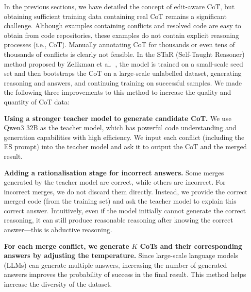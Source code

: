 \documentclass[sigconf,review,anonymous]{acmart}
\newcommand{\stma}[1]{\todo[inline]{\textcolor{black}{#1}}}
\begin{document}
In the previous sections, we have detailed the concept of edit-aware CoT, but obtaining sufficient training data containing real CoT remains a significant challenge. 
Although examples containing conflicts and resolved code are easy to obtain from code repositories, these examples do not contain explicit reasoning processes (i.e., CoT). 
Manually annotating CoT for thousands or even tens of thousands of conflicts is clearly not feasible. 
In the STaR (Self-Taught Reasoner) method proposed by Zelikman et al.~\cite{star}, the model is trained on a small-scale seed set and then bootstraps the CoT on a large-scale unlabelled dataset, generating reasoning and answers, and continuing training on successful samples. 
We made the following three improvements to this method to increase the quality and quantity of CoT data:

\textbf{Using a stronger teacher model to generate candidate CoT.} We use Qwen3 32B as the teacher model, which has powerful code understanding and generation capabilities with high efficiency. We input each conflict (including the ES prompt) into the teacher model and ask it to output the CoT and the merged result.

\textbf{Adding a rationalisation stage for incorrect answers.} Some merges generated by the teacher model are correct, while others are incorrect. For incorrect merges, we do not discard them directly. Instead, we provide the correct merged code (from the training set) and ask the teacher model to explain this correct answer. 
Intuitively, even if the model initially cannot generate the correct reasoning, it can still produce reasonable reasoning after knowing the correct answer—this is abductive reasoning.

\textbf{For each merge conflict, we generate $K$ CoTs and their corresponding answers by adjusting the temperature.} Since large-scale language models (LLMs) can generate multiple answers, increasing the number of generated answers improves the probability of success in the final result. This method helps increase the diversity of the dataset.
\end{document}
